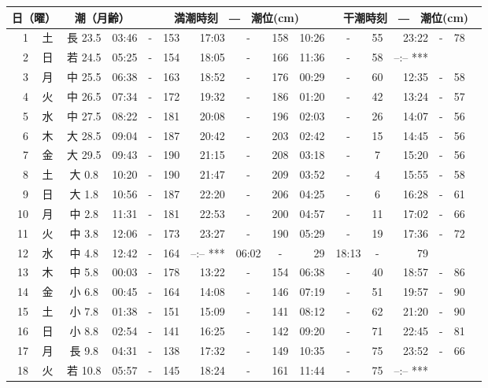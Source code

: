 \documentclass[12pt.a4j]{jsarticle}
\begin{document}
\begin{center}
\begin{table}[ht]
 \begin{tabular}{|rc|cr|ccrccr|ccrccr|}
 \hline
 \multicolumn{2}{|c|}{日（曜）} & \multicolumn{2}{c|}{潮（月齢）} & \multicolumn{6}{c|}{満潮時刻　―　潮位(cm)} & \multicolumn{6}{c|}{干潮時刻　―　潮位(cm)} \\
 \hline
 1 & 土 & 長 23.5 & 03:46 &-& 153 & 17:03 &-& 158 & 10:26 &-&  55 & 23:22 &-&  78 \\
\hline
 2 & 日 & 若 24.5 & 05:25 &-& 154 & 18:05 &-& 166 & 11:36 &-&  58 & --:--   *** \\
\hline
 3 & 月 & 中 25.5 & 06:38 &-& 163 & 18:52 &-& 176 & 00:29 &-&  60 & 12:35 &-&  58 \\
\hline
 4 & 火 & 中 26.5 & 07:34 &-& 172 & 19:32 &-& 186 & 01:20 &-&  42 & 13:24 &-&  57 \\
\hline
 5 & 水 & 中 27.5 & 08:22 &-& 181 & 20:08 &-& 196 & 02:03 &-&  26 & 14:07 &-&  56 \\
\hline
 6 & 木 & 大 28.5 & 09:04 &-& 187 & 20:42 &-& 203 & 02:42 &-&  15 & 14:45 &-&  56 \\
\hline
 7 & 金 & 大 29.5 & 09:43 &-& 190 & 21:15 &-& 208 & 03:18 &-&   7 & 15:20 &-&  56 \\
\hline
 8 & 土 & 大  0.8 & 10:20 &-& 190 & 21:47 &-& 209 & 03:52 &-&   4 & 15:55 &-&  58 \\
\hline
 9 & 日 & 大  1.8 & 10:56 &-& 187 & 22:20 &-& 206 & 04:25 &-&   6 & 16:28 &-&  61 \\
\hline
10 & 月 & 中  2.8 & 11:31 &-& 181 & 22:53 &-& 200 & 04:57 &-&  11 & 17:02 &-&  66 \\
\hline
11 & 火 & 中  3.8 & 12:06 &-& 173 & 23:27 &-& 190 & 05:29 &-&  19 & 17:36 &-&  72 \\
\hline
12 & 水 & 中  4.8 & 12:42 &-& 164 & --:--   *** & 06:02 &-&  29 & 18:13 &-&  79 \\
\hline
13 & 木 & 中  5.8 & 00:03 &-& 178 & 13:22 &-& 154 & 06:38 &-&  40 & 18:57 &-&  86 \\
\hline
14 & 金 & 小  6.8 & 00:45 &-& 164 & 14:08 &-& 146 & 07:19 &-&  51 & 19:57 &-&  90 \\
\hline
15 & 土 & 小  7.8 & 01:38 &-& 151 & 15:09 &-& 141 & 08:12 &-&  62 & 21:20 &-&  90 \\
\hline
16 & 日 & 小  8.8 & 02:54 &-& 141 & 16:25 &-& 142 & 09:20 &-&  71 & 22:45 &-&  81 \\
\hline
17 & 月 & 長  9.8 & 04:31 &-& 138 & 17:32 &-& 149 & 10:35 &-&  75 & 23:52 &-&  66 \\
\hline
18 & 火 & 若 10.8 & 05:57 &-& 145 & 18:24 &-& 161 & 11:44 &-&  75 & --:--   *** \\

\end{tabular}
\end{table}
\end{center}
\end{document}
